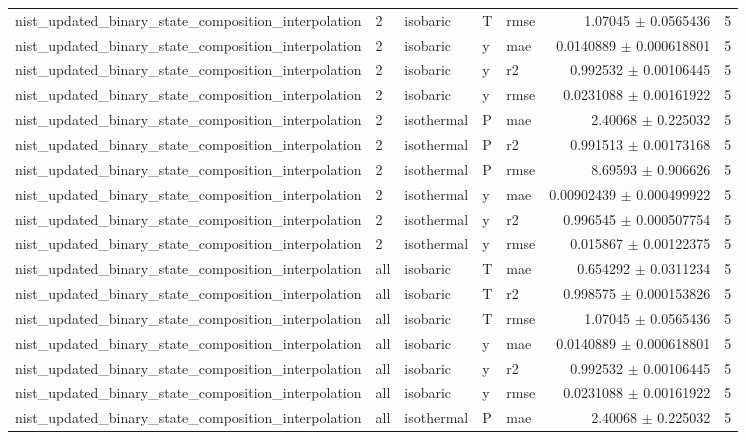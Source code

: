 \begin{tabular}{lllllrr}
nist\_updated\_binary\_state\_composition\_interpolation & 2 & isobaric & T & rmse & 1.07045 $\pm$ 0.0565436 & 5 \\
nist\_updated\_binary\_state\_composition\_interpolation & 2 & isobaric & y & mae & 0.0140889 $\pm$ 0.000618801 & 5 \\
nist\_updated\_binary\_state\_composition\_interpolation & 2 & isobaric & y & r2 & 0.992532 $\pm$ 0.00106445 & 5 \\
nist\_updated\_binary\_state\_composition\_interpolation & 2 & isobaric & y & rmse & 0.0231088 $\pm$ 0.00161922 & 5 \\
nist\_updated\_binary\_state\_composition\_interpolation & 2 & isothermal & P & mae & 2.40068 $\pm$ 0.225032 & 5 \\
nist\_updated\_binary\_state\_composition\_interpolation & 2 & isothermal & P & r2 & 0.991513 $\pm$ 0.00173168 & 5 \\
nist\_updated\_binary\_state\_composition\_interpolation & 2 & isothermal & P & rmse & 8.69593 $\pm$ 0.906626 & 5 \\
nist\_updated\_binary\_state\_composition\_interpolation & 2 & isothermal & y & mae & 0.00902439 $\pm$ 0.000499922 & 5 \\
nist\_updated\_binary\_state\_composition\_interpolation & 2 & isothermal & y & r2 & 0.996545 $\pm$ 0.000507754 & 5 \\
nist\_updated\_binary\_state\_composition\_interpolation & 2 & isothermal & y & rmse & 0.015867 $\pm$ 0.00122375 & 5 \\
nist\_updated\_binary\_state\_composition\_interpolation & all & isobaric & T & mae & 0.654292 $\pm$ 0.0311234 & 5 \\
nist\_updated\_binary\_state\_composition\_interpolation & all & isobaric & T & r2 & 0.998575 $\pm$ 0.000153826 & 5 \\
nist\_updated\_binary\_state\_composition\_interpolation & all & isobaric & T & rmse & 1.07045 $\pm$ 0.0565436 & 5 \\
nist\_updated\_binary\_state\_composition\_interpolation & all & isobaric & y & mae & 0.0140889 $\pm$ 0.000618801 & 5 \\
nist\_updated\_binary\_state\_composition\_interpolation & all & isobaric & y & r2 & 0.992532 $\pm$ 0.00106445 & 5 \\
nist\_updated\_binary\_state\_composition\_interpolation & all & isobaric & y & rmse & 0.0231088 $\pm$ 0.00161922 & 5 \\
nist\_updated\_binary\_state\_composition\_interpolation & all & isothermal & P & mae & 2.40068 $\pm$ 0.225032 & 5 \\

\end{tabular}
